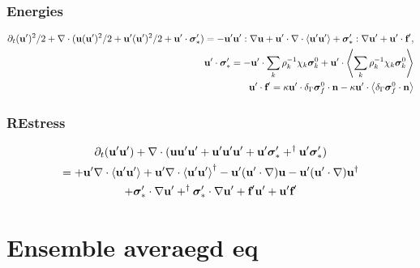 \subsubsection{Energies}
\begin{align*}
    \partial_t (\textbf{u}')^2/2
    + \mathbf{\nabla}\cdot ( \textbf{u}(\textbf{u}')^2/2
    +  \textbf{u}' (\textbf{u}')^2/2
    + \textbf{u}'\cdot \bm\sigma_*')
    =
    - \textbf{u}'\textbf{u}' : \mathbf{\nabla} \textbf{u}
    + \textbf{u}' \cdot \mathbf{\nabla}\cdot \left<\textbf{u}'\textbf{u}'\right>
    + \bm\sigma_*':\mathbf{\nabla} \textbf{u}' +  \textbf{u}'\cdot \textbf{f}',
    \\
    \textbf{u}'\cdot \bm\sigma_*'
    =
    - \textbf{u}'\cdot \sum_k \rho^{-1}_k \chi_k \bm\sigma_k^0
    + \textbf{u}'\cdot \left<\sum_k \rho^{-1}_k \chi_k \bm\sigma_k^0  \right>\\
    \textbf{u}'\cdot \textbf{f}'
    =
    \kappa   \textbf{u}' \cdot \delta_{\Gamma}  \bm\sigma_f^0 \cdot \textbf{n}
    - \kappa \textbf{u}' \cdot \left<\delta_{\Gamma}  \bm\sigma_f^0 \cdot \textbf{n}\right>
    \\
\end{align*}
\subsubsection{REstress}
\begin{multline}
    \partial_t (\textbf{u}'\textbf{u}')
    + \mathbf{\nabla}\cdot (
         \textbf{u}\textbf{u}'\textbf{u}'
         +  \textbf{u}' \textbf{u}'\textbf{u}'
         + \textbf{u}'\bm\sigma_*'
         + ^\dagger\textbf{u}'\bm\sigma_*')
         \\
         = 
         +\textbf{u}'\mathbf{\nabla}\cdot \left<\textbf{u}'\textbf{u}'\right>
         +\textbf{u}'\mathbf{\nabla}\cdot \left<\textbf{u}'\textbf{u}'\right>^\dagger
         - \textbf{u}' (\textbf{u}'\cdot \mathbf{\nabla})\textbf{u}
         - \textbf{u}' (\textbf{u}'\cdot \mathbf{\nabla})\textbf{u}^\dagger\\
    + \bm\sigma_*'\cdot \mathbf{\nabla} \textbf{u}'
    +^\dagger \bm\sigma_*'\cdot \mathbf{\nabla} \textbf{u}'
    + \textbf{f}'\textbf{u}'
    + \textbf{u}'\textbf{f}'
\end{multline}

\section{Ensemble averaegd eq}


